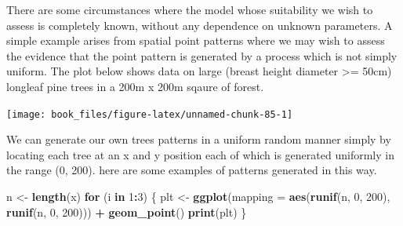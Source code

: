 \documentclass[
]{book}
\newenvironment{Shaded}{\begin{snugshade}}{\end{snugshade}}
\newcommand{\AttributeTok}[1]{\textcolor[rgb]{0.13,0.29,0.53}{#1}}
\newcommand{\ControlFlowTok}[1]{\textcolor[rgb]{0.13,0.29,0.53}{\textbf{#1}}}
\newcommand{\DecValTok}[1]{\textcolor[rgb]{0.00,0.00,0.81}{#1}}
\newcommand{\FunctionTok}[1]{\textcolor[rgb]{0.13,0.29,0.53}{\textbf{#1}}}
\newcommand{\NormalTok}[1]{#1}
\newcommand{\OtherTok}[1]{\textcolor[rgb]{0.56,0.35,0.01}{#1}}
\newcommand{\SpecialCharTok}[1]{\textcolor[rgb]{0.81,0.36,0.00}{\textbf{#1}}}
\begin{document}
There are some circumstances where the model whose suitability we wish to assess is completely known, without any dependence on unknown parameters. A simple example arises from spatial point patterns where we may wish to assess the evidence that the point pattern is generated by a process which is not simply uniform. The plot below shows data on large (breast height diameter \textgreater= 50cm) longleaf pine trees in a 200m x 200m sqaure of forest.

\begin{Shaded}
\end{Shaded}

\begin{center}\texttt{[image: book\_files/figure-latex/unnamed-chunk-85-1]} \end{center}

We can generate our own trees patterns in a uniform random manner simply by locating each tree at an x and y position each of which is generated uniformly in the range (0, 200). here are some examples of patterns generated in this way.

\begin{Shaded}
\begin{Highlighting}[]
\NormalTok{n }\OtherTok{\textless{}{-}} \FunctionTok{length}\NormalTok{(x)}
\ControlFlowTok{for}\NormalTok{ (i }\ControlFlowTok{in} \DecValTok{1}\SpecialCharTok{:}\DecValTok{3}\NormalTok{) \{}
\NormalTok{   plt }\OtherTok{\textless{}{-}} \FunctionTok{ggplot}\NormalTok{(}\AttributeTok{mapping =} \FunctionTok{aes}\NormalTok{(}\FunctionTok{runif}\NormalTok{(n, }\DecValTok{0}\NormalTok{, }\DecValTok{200}\NormalTok{), }\FunctionTok{runif}\NormalTok{(n, }\DecValTok{0}\NormalTok{, }\DecValTok{200}\NormalTok{))) }\SpecialCharTok{+}
            \FunctionTok{geom\_point}\NormalTok{()}
  \FunctionTok{print}\NormalTok{(plt)}
\NormalTok{\}}
\end{Highlighting}
\end{Shaded}
\end{document}
